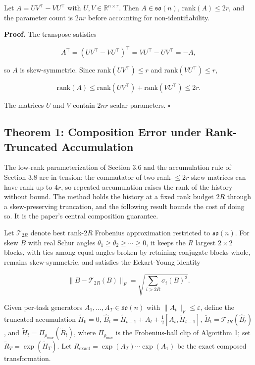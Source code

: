 \documentclass[
]{article}
\begin{document}
Let \(A=UV^\top-VU^\top\) with \(U,V\in\mathbb{R}^{n\times r}\). Then \(A\in\mathfrak{so}(n)\), \(\mathrm{rank}(A)\leq 2r\), and the parameter count is \(2nr\) before accounting for non-identifiability.

\textbf{Proof.} The transpose satisfies

\[
A^\top=(UV^\top-VU^\top)^\top=VU^\top-UV^\top=-A,
\]

so \(A\) is skew-symmetric. Since \(\mathrm{rank}(UV^\top)\leq r\) and \(\mathrm{rank}(VU^\top)\leq r\),

\[
\mathrm{rank}(A)\leq \mathrm{rank}(UV^\top)+\mathrm{rank}(VU^\top)\leq 2r.
\]

The matrices \(U\) and \(V\) contain \(2nr\) scalar parameters. \(\square\)

\subsection{Theorem 1: Composition Error under Rank-Truncated Accumulation}\label{theorem-1-composition-error-under-rank-truncated-accumulation}

The low-rank parameterization of Section 3.6 and the accumulation rule of Section 3.8 are in tension: the commutator of two rank-\(\leq 2r\) skew matrices can have rank up to \(4r\), so repeated accumulation raises the rank of the history without bound. The method holds the history at a fixed rank budget \(2R\) through a skew-preserving truncation, and the following result bounds the cost of doing so. It is the paper's central composition guarantee.

Let \(\mathcal{T}_{2R}\) denote best rank-\(2R\) Frobenius approximation restricted to \(\mathfrak{so}(n)\). For skew \(B\) with real Schur angles \(\theta_1\geq\theta_2\geq\cdots\geq 0\), it keeps the \(R\) largest \(2\times 2\) blocks, with ties among equal angles broken by retaining conjugate blocks whole, remains skew-symmetric, and satisfies the Eckart-Young identity

\[
\|B-\mathcal{T}_{2R}(B)\|_F=\sqrt{\sum_{i>2R}\sigma_i(B)^2}.
\]

Given per-task generators \(A_1,\dots,A_T\in\mathfrak{so}(n)\) with \(\|A_t\|_F\leq\varepsilon\), define the truncated accumulation \(\tilde{H}_0=0\), \(\hat{B}_t=\tilde{H}_{t-1}+A_t+\tfrac{1}{2}[A_t,\tilde{H}_{t-1}]\), \(\breve{B}_t=\mathcal{T}_{2R}(\hat{B}_t)\), and \(\tilde{H}_t=\Pi_{\rho_{\max}}(\breve{B}_t)\), where \(\Pi_{\rho_{\max}}\) is the Frobenius-ball clip of Algorithm 1; set \(\tilde{R}_T=\exp(\tilde{H}_T)\). Let \(R_{\mathrm{exact}}=\exp(A_T)\cdots\exp(A_1)\) be the exact composed transformation.
\end{document}
